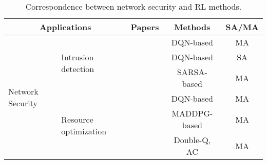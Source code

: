 \documentclass[acmsmall]{acmart}
\begin{document}
\begin{table}[]
\centering
\caption{Correspondence between network security and RL methods.}
\label{network}
\begin{tabularx}{\textwidth}{|XX|c|c|c|}
\hline
\multicolumn{2}{|c|}{Applications}                                                               & Papers                                                                                     & Methods                                    & \multicolumn{1}{c|}{SA/MA} \\ \hline
\multicolumn{1}{|X|}{\multirow{6}{=}{\centering Network Security}} & \multirow{3}{=}{\centering Intrusion detection}   & \cite{10.1007/978-3-540-87805-6_15,SETHI2021102923,louati2022distributed,chowdhary2021sdn} & DQN-based \cite{dqn}                       & MA                         \\ \cline{3-5} 
\multicolumn{1}{|X|}{}                                  &                                        & \cite{9335796}                                                                             & DQN-based \cite{dqn}                       & SA                         \\ \cline{3-5} 
\multicolumn{1}{|X|}{}                                  &                                        & \cite{mohamed2021adversarial}                                                              & SARSA-based \cite{kuzmin2002connectionist} & MA                         \\ \cline{2-5} 
\multicolumn{1}{|X|}{}                                  & \multirow{3}{=}{\centering Resource optimization} & \cite{9348210,SUN2020107230,li2019cooperative}                                             & DQN-based \cite{dqn}                       & MA                         \\ \cline{3-5} 
\multicolumn{1}{|X|}{}                                  &                                        & \cite{9254093}                                                                             & MADDPG-based \cite{maddpg}                 & MA                         \\ \cline{3-5} 
\multicolumn{1}{|X|}{}                                  &                                        & \cite{9329087}                                                                             & Double-Q, AC \cite{doubleq,ac}             & MA                         \\ \hline
\end{tabularx}
\end{table}
\end{document}
